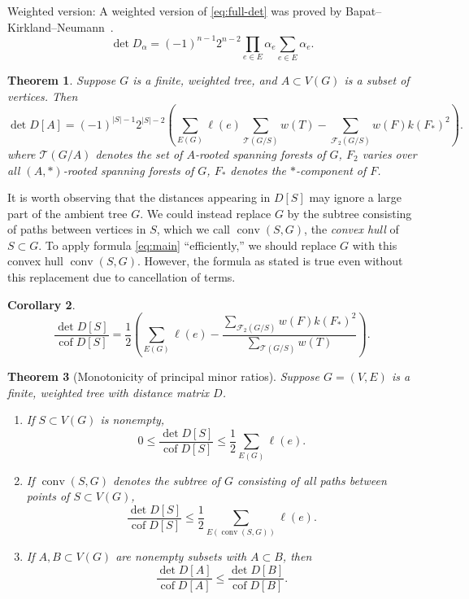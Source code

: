 \documentclass{amsart}
\newtheorem{thm}{Theorem}
\newtheorem{cor}[thm]{Corollary}
\theoremstyle{definition}
\DeclareMathOperator{\cof}{cof}
\DeclareMathOperator{\conv}{conv}
\newcommand{\trees}{\mathcal{T}}
\newcommand{\forests}{\mathcal{F}}
\begin{document}
Weighted version:
A weighted version of \eqref{eq:full-det} was proved by Bapat--Kirkland--Neumann~\cite{bapat-kirkland-neumann}.
\begin{equation}\label{eq:w-full-det}
\det D_{\alpha} = (-1)^{n-1} 2^{n-2} \prod_{e \in E} \alpha_e \sum_{e \in E} \alpha_e .
\end{equation}
\begin{thm}
\label{thm:w-main}
Suppose $G$ is a finite, weighted tree, and $A \subset V(G)$ is a subset of vertices.
Then
\begin{equation}\label{eq:w-main}
\det D[A] = (-1)^{|S|-1} 2^{|S|-2} \left( \sum_{E(G)}\ell(e) \sum_{\trees(G/S)} w(T) - \sum_{\forests_2(G/S)} w(F) k(F_{*})^2 \right).
\end{equation}
where 
$\mathcal T(G/A)$ denotes the set of $A$-rooted spanning forests of $G$,
$F_2$ varies over all $(A,*)$-rooted spanning forests of $G$,
$F_{*}$ denotes the $*$-component of $F$.
\end{thm}

It is worth observing that the distances appearing in $D[S]$ may ignore a large part of the ambient tree $G$.
We could instead replace $G$ by the subtree consisting of paths between vertices in $S$,
which we call $\conv(S,G)$, the {\em convex hull} of $S \subset G$.
To apply formula \eqref{eq:main} ``efficiently,''
we should replace $G$ with this convex hull $\conv(S,G)$.
However, the formula as stated is true even without this replacement due to cancellation of terms.

\begin{cor}
\begin{equation}
\frac{\det D[S]}{\cof D[S]} = \frac12 \left( \sum_{E(G)} \ell(e) - \frac{\sum_{\forests_2(G/S)} w(F) k(F_*)^2}{\sum_{\trees(G/S)} w(T)} \right) .
\end{equation}
\end{cor}

\begin{thm}[Monotonicity of principal minor ratios]
Suppose $G = (V,E)$ is a finite, weighted tree with distance matrix $D$.
\begin{enumerate}
\item 
If $S \subset V(G)$ is nonempty,
\begin{equation*}
0 \leq \frac{\det D[S]}{\cof D[S]} \leq \frac12 \sum_{E(G)} \ell(e) .
\end{equation*}

\item 
If $\conv(S,G)$ denotes the subtree of $G$ consisting of all paths between points of $S \subset V(G)$,
\begin{equation*}
 \frac{\det D[S]}{\cof D[S]} \leq \frac12 \sum_{E(\conv(S, G))} \ell(e) .
\end{equation*}

\item 
If $A,B \subset V(G)$
are nonempty subsets with
$A \subset B$,
then
\begin{equation*}
 \frac{\det D[A]}{\cof D[A]}  \leq \frac{\det D[B]}{\cof D[B]}  .
\end{equation*}
\end{enumerate}
\end{thm}
\end{document}
